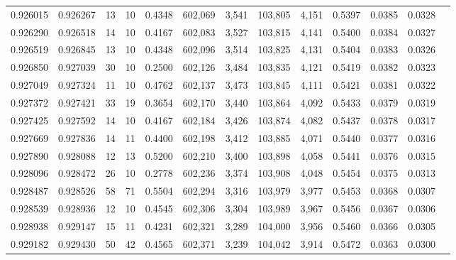 \begin{tabular}{rrrrrrrrrrrrr}
0.926015 & 0.926267 &    13 &  10 &                                     0.4348 & 602,069 &   3,541 & 103,805 &   4,151 & 0.5397 & 0.0385 & 0.0328 \\
0.926290 & 0.926518 &    14 &  10 &                                     0.4167 & 602,083 &   3,527 & 103,815 &   4,141 & 0.5400 & 0.0384 & 0.0327 \\
0.926519 & 0.926845 &    13 &  10 &                                     0.4348 & 602,096 &   3,514 & 103,825 &   4,131 & 0.5404 & 0.0383 & 0.0326 \\
0.926850 & 0.927039 &    30 &  10 &                                     0.2500 & 602,126 &   3,484 & 103,835 &   4,121 & 0.5419 & 0.0382 & 0.0323 \\
0.927049 & 0.927324 &    11 &  10 &                                     0.4762 & 602,137 &   3,473 & 103,845 &   4,111 & 0.5421 & 0.0381 & 0.0322 \\
0.927372 & 0.927421 &    33 &  19 &                                     0.3654 & 602,170 &   3,440 & 103,864 &   4,092 & 0.5433 & 0.0379 & 0.0319 \\
0.927425 & 0.927592 &    14 &  10 &                                     0.4167 & 602,184 &   3,426 & 103,874 &   4,082 & 0.5437 & 0.0378 & 0.0317 \\
0.927669 & 0.927836 &    14 &  11 &                                     0.4400 & 602,198 &   3,412 & 103,885 &   4,071 & 0.5440 & 0.0377 & 0.0316 \\
0.927890 & 0.928088 &    12 &  13 &                                     0.5200 & 602,210 &   3,400 & 103,898 &   4,058 & 0.5441 & 0.0376 & 0.0315 \\
0.928096 & 0.928472 &    26 &  10 &                                     0.2778 & 602,236 &   3,374 & 103,908 &   4,048 & 0.5454 & 0.0375 & 0.0313 \\
0.928487 & 0.928526 &    58 &  71 &                                     0.5504 & 602,294 &   3,316 & 103,979 &   3,977 & 0.5453 & 0.0368 & 0.0307 \\
0.928539 & 0.928936 &    12 &  10 &                                     0.4545 & 602,306 &   3,304 & 103,989 &   3,967 & 0.5456 & 0.0367 & 0.0306 \\
0.928938 & 0.929147 &    15 &  11 &                                     0.4231 & 602,321 &   3,289 & 104,000 &   3,956 & 0.5460 & 0.0366 & 0.0305 \\
0.929182 & 0.929430 &    50 &  42 &                                     0.4565 & 602,371 &   3,239 & 104,042 &   3,914 & 0.5472 & 0.0363 & 0.0300 \\

\end{tabular}
